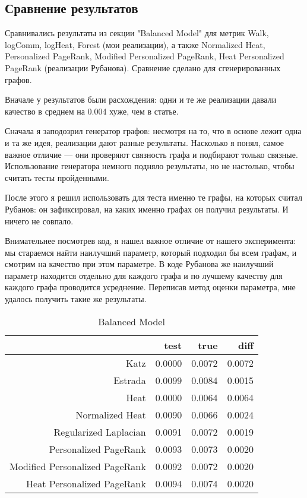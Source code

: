 \documentclass{article}
\begin{document}
\subsection{Сравнение результатов}
Сравнивались результаты из секции "Balanced Model" для метрик Walk, logComm, logHeat, Forest (мои реализации), а также Normalized Heat, Personalized PageRank, Modified Personalized PageRank, Heat Personalized PageRank (реализации Рубанова). Сравнение сделано для сгенерированных графов.

Вначале у результатов были расхождения: одни и те же реализации давали качество в среднем на 0.004 хуже, чем в статье.

Сначала я заподозрил генератор графов: несмотря на то, что в основе лежит одна и та же идея, реализации дают разные результаты. Насколько я понял, самое важное отличие --- они проверяют связность графа и подбирают только связные. Использование генератора немного подняло результаты, но не настолько, чтобы считать тесты пройденными.

После этого я решил использовать для теста именно те графы, на которых считал Рубанов: он зафиксировал, на каких именно графах он получил результаты. И ничего не совпало.

Внимательнее посмотрев код, я нашел важное отличие от нашего эксперимента: мы стараемся найти наилучший параметр, который подходил бы всем графам, и смотрим на качество при этом параметре. В коде Рубанова же наилучший параметр находится отдельно для каждого графа и по лучшему качеству для каждого графа проводится усреднение. Переписав метод оценки параметра, мне удалось получить такие же результаты. 

\begin{table}[H]
\centering
\caption{Balanced Model}
\label{my-label}
\begin{tabular}{r|rrr}
                               & test   & true   & diff   \\
                               \hline
Katz                           & 0.0000 & 0.0072 & \cellcolor{red!25} 0.0072 \\
Estrada                        & 0.0099 & 0.0084 & \cellcolor{yellow!25} 0.0015 \\
Heat                           & 0.0000 & 0.0064 & \cellcolor{red!25} 0.0064 \\
Normalized Heat                & 0.0090 & 0.0066 & \cellcolor{yellow!25} 0.0024 \\
Regularized Laplacian          & 0.0091 & 0.0072 & \cellcolor{yellow!25} 0.0019 \\
Personalized PageRank          & 0.0093 & 0.0073 & \cellcolor{yellow!25} 0.0020 \\
Modified Personalized PageRank & 0.0092 & 0.0072 & \cellcolor{yellow!25} 0.0020 \\
Heat Personalized PageRank     & 0.0094 & 0.0074 & \cellcolor{yellow!25} 0.0020
\end{tabular}
\end{table}
\end{document}
